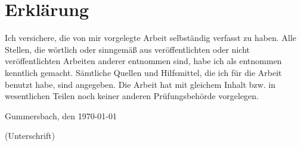 \documentclass[12pt,oneside,a4paper,bibtotoc,liststotoc]{scrreprt}
\begin{document}
%
%
% 
% 
%
%
% 
% 
% 
%
\chapter{Erklärung}

Ich versichere, die von mir vorgelegte Arbeit selbständig verfasst zu
haben. Alle Stellen, die wörtlich oder sinngemäß aus veröffentlichten
oder nicht veröffentlichten Arbeiten anderer entnommen sind, habe ich
als entnommen kenntlich gemacht. Sämtliche Quellen und Hilfsmittel,
die ich für die Arbeit benutzt habe, sind angegeben. Die Arbeit hat
mit gleichem Inhalt bzw. in wesentlichen Teilen noch keiner anderen
Prüfungsbehörde vorgelegen.

\bigskip

Gummersbach, den \today

\bigskip

\bigskip

\bigskip

\bigskip

\bigskip

\bigskip

(Unterschrift)
\end{document}
